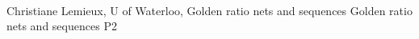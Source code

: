     \\\hline
{}	%
{}		%
{Christiane Lemieux, U of Waterloo, Golden ratio nets and sequences}	%
{Golden ratio nets and sequences}		%
{P2}		%
\\\hline
